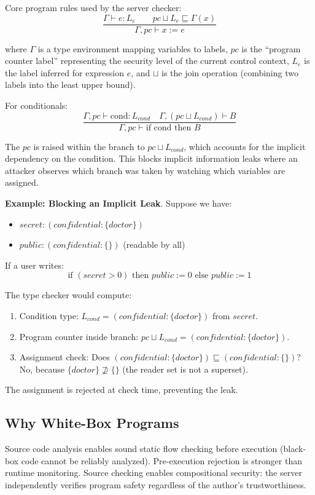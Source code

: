 Core program rules used by the server checker:
\[
\frac{\Gamma \vdash e : L_e \qquad pc \sqcup L_e \sqsubseteq \Gamma(x)}{\Gamma,pc \vdash x := e}
\]

where $\Gamma$ is a type environment mapping variables to labels, $pc$ is the ``program counter label'' representing the security level of the current control context, $L_e$ is the label inferred for expression $e$, and $\sqcup$ is the join operation (combining two labels into the least upper bound).

For conditionals:
\[
\frac{\Gamma, pc \vdash \text{cond} : L_{cond} \quad \Gamma, (pc \sqcup L_{cond}) \vdash B}{\Gamma, pc \vdash \text{if cond then } B}
\]

The $pc$ is raised within the branch to $pc \sqcup L_{cond}$, which accounts for the implicit dependency on the condition. This blocks implicit information leaks where an attacker observes which branch was taken by watching which variables are assigned.

\textbf{Example: Blocking an Implicit Leak}. Suppose we have:
\begin{itemize}
    \item $secret: (confidential:\{doctor\})$
    \item $public: (confidential:\{\})$ (readable by all)
\end{itemize}

If a user writes:
\[\text{if } (secret > 0) \text{ then } public := 0 \text{ else } public := 1\]

The type checker would compute:
\begin{enumerate}
    \item Condition type: $L_{cond} = (confidential:\{doctor\})$ from $secret$.
    \item Program counter inside branch: $pc \sqcup L_{cond} = (confidential:\{doctor\})$.
    \item Assignment check: Does $(confidential:\{doctor\}) \sqsubseteq (confidential:\{\})$? No, because $\{doctor\} \not\supseteq \{\}$ (the reader set is not a superset). \times
\end{enumerate}

The assignment is rejected at check time, preventing the leak.

\subsection{Why White-Box Programs}

Source code analysis enables sound static flow checking before execution (black-box code cannot be reliably analyzed). Pre-execution rejection is stronger than runtime monitoring. Source checking enables compositional security: the server independently verifies program safety regardless of the author's trustworthiness.

